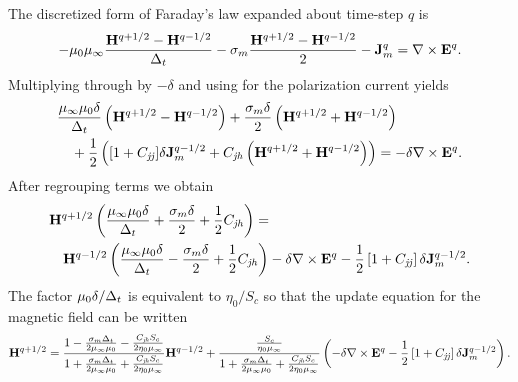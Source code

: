 The discretized form of Faraday's law expanded about time-step $q$ is
\begin{equation}
 -\mu_0\mu_\infty\frac{\mathbf{H}^{q+1/2}-\mathbf{H}^{q-1/2}}{\Delta_t}
 - \sigma_m\frac{\mathbf{H}^{q+1/2}-\mathbf{H}^{q-1/2}}{2} - \mathbf{J}_m^q =
	\nabla\times\mathbf{E}^q.
\end{equation}
Multiplying through by $-\delta$ and using  for
the polarization current yields
\begin{eqnarray}
 \lefteqn{\frac{\mu_\infty\mu_0\delta}{\Delt} 
 \left(\Hvec^{q+1/2}-\Hvec^{q-1/2}\right)
 +\frac{\sigma_m\delta}{2}\left(\Hvec^{q+1/2}+\Hvec^{q-1/2}\right)} 
 \nonumber\\
 && \mbox{} + \frac{1}{2}\left([1+\cjj]\delta\Jmvec^{q-1/2} +
    \cjh\left(\Hvec^{q+1/2}+\Hvec^{q-1/2}\right)\right)=
	-\delta\nabla\times\Evec^q.
 \label{eq:faradayDrude}
\end{eqnarray}
After regrouping terms we obtain
\begin{eqnarray}
 \lefteqn{\Hvec^{q+1/2}\left(\frac{\mu_\infty\mu_0\delta}{\Delt} 
                   + \frac{\sigma_m\delta}{2}
                   + \frac{1}{2}\cjh\right) =} \nonumber\\
 &&\Hvec^{q-1/2}\left(\frac{\mu_\infty\mu_0\delta}{\Delt} 
                   - \frac{\sigma_m\delta}{2}
                   + \frac{1}{2}\cjh\right)
 -\delta\nabla\times\Evec^q -
 \frac{1}{2}\left[1+\cjj\right]\delta\Jmvec^{q-1/2}.
 \label{eq:hUpdateDrude}
\end{eqnarray}
The factor $\mu_0\delta/\Delta_t$ is equivalent to $\eta_0/S_c$ so that
the update equation for the magnetic field can be written
\begin{equation}
 \mathbf{H}^{q+1/2}=
  \frac{1 - \frac{\sigma_m\Delta_t}{2\mu_\infty\mu_0}
          - \frac{C_{\mathit{jh}} S_c}{2\eta_0 \mu_\infty}}
       {1 + \frac{\sigma_m\Delta_t}{2\mu_\infty\mu_0}
          + \frac{C_{\mathit{jh}} S_c}{2\eta_0 \mu_\infty}} \mathbf{H}^{q-1/2}
 + \frac{\frac{S_c}{\eta_0 \mu_\infty}}{1
                   + \frac{\sigma_m\Delta_t}{2\mu_\infty\mu_0}
                   + \frac{C_{\mathit{jh}} S_c}{2\eta_0 \mu_\infty}}
 \left(-\delta\nabla\times\mathbf{E}^q -
       \frac{1}{2}\left[1+C_{\mathit{jj}}\right]\delta\mathbf{J}_m^{q-1/2}\right).
 \label{eq:hUpdateDrudeI}
\end{equation}


